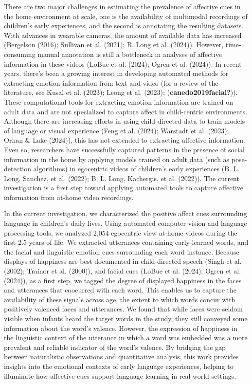 \documentclass[10pt, letterpaper]{article}
\begin{document}
There are two major challenges in estimating the prevalence of affective
cues in the home environment at scale, one is the availability of
multimodal recordings of children's early experiences, and the second is
annotating the resulting datasets. With advances in wearable cameras,
the amount of available data has increased (Bergelson (2016); Sullivan
et al. (2021); B. Long et al. (2024)). However, time-consuming manual
annotation is still a bottleneck in analyses of affective information in
these videos (LoBue et al. (2024); Ogren et al. (2024)). In recent
years, there's been a growing interest in developing automated methods
for extracting emotion information from text and video (for a review of
the literature, see Kusal et al. (2023); Leong et al. (2023);
(\textbf{canedo2019facial?})). These computational tools for extracting
emotion information are trained on adult data and are not specialized to
capture affect in child-centric environments. Although there are
increasing efforts in using child-directed data to train models of
language or visual experience (Feng et al. (2024); Warstadt et al.
(2023); Orhan \& Lake (2024)), this has not extended to extracting
affective information. Even so, researchers have successfully captured
patterns in the presence of social information in the home by applying
models trained on adult data (such as pose-detection algorithms) in
egocentric videos of children's early experiences (B. L. Long, Sanchez,
et al. (2022); B. L. Long, Kachergis, et al. (2022)). The current
investigation is a first step toward applying automated tools to capture
affective information from at-home video recordings.

In the current investigation, we characterized the positive affect cues
surrounding language in children's daily lives. Using automated computer
vision and language processing tools, we analyzed 2,054 egocentric view
at-home videos during the first 2.5 years of life. We extracted
utterances containing early-learned words, and the facial and linguistic
emotion cues surrounding each word instance. Because displays of
happiness are best documented in child-directed speech (Singh et al.
(2002); Trainor et al. (2000)), and facial cues (LoBue et al. (2024);
Ogren et al. (2024)), as a first step, we tagged the degree of displayed
happiness in the faces and utterances that coocurred with each word.
This enables us to capture the availability of these signals across age,
the extent to which words concur with positively valenced faces and
utterances. We found that while faces were seldom visible when infants
heard the target words in the study, they still conveyed some
information about the word's valence. However, the expression of
happiness in the linguistic context of the utterance in which a word was
embedded was a more prevalent and reliable indicator of the word's
valence. By bridging the gap between naturalistic observations and
quantitative analysis, this work provides insights into the emotional
contexts of early language experiences, helping to illuminate how
affective cues support language learning in real-world settings.
\end{document}
